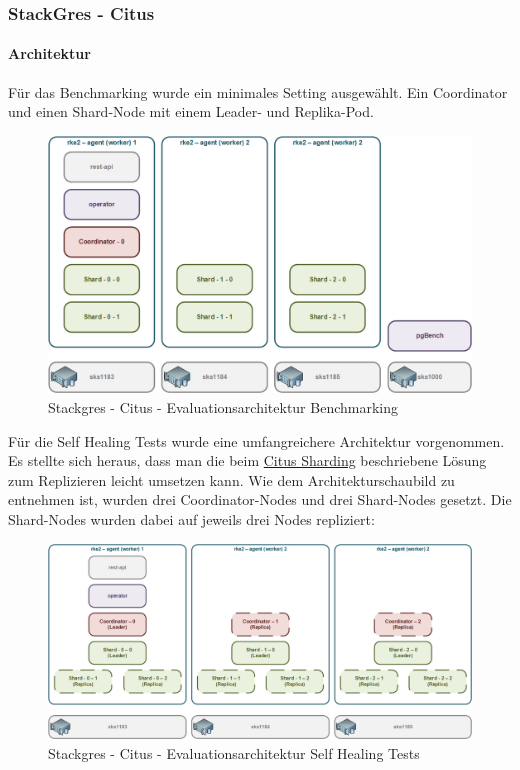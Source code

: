 
\clearpage
\begin{flushleft}
    \subsubsection{StackGres - Citus}
    \paragraph{Architektur}
    Für das Benchmarking wurde ein minimales Setting ausgewählt.
    Ein Coordinator und einen Shard-Node mit einem Leader- und Replika-Pod.
    \begin{figure}[H]
        \centering
        \includegraphics[width=0.8\linewidth]{source/implementation/evaluation/postgresql_ha_solutions/stackgres/stackgres-citus-evaluation-architecture}
        \caption{Stackgres - Citus - Evaluationsarchitektur Benchmarking}
        \label{fig:stackgres-citus-evaluation-architecture}
    \end{figure}
    Für die Self Healing Tests wurde eine umfangreichere Architektur vorgenommen.
    Es stellte sich heraus, dass man die beim \hyperref[subpar:citus_sharding]{Citus Sharding} beschriebene Lösung zum Replizieren leicht umsetzen kann.
    Wie dem Architekturschaubild zu entnehmen ist,
    wurden drei Coordinator-Nodes und drei Shard-Nodes gesetzt.
    Die Shard-Nodes wurden dabei auf jeweils drei Nodes repliziert:
    \begin{figure}[H]
        \centering
        \includegraphics[width=1\linewidth]{source/implementation/evaluation/postgresql_ha_solutions/stackgres/stackgres_citus_architecture_self_healing_test}
        \caption{Stackgres - Citus - Evaluationsarchitektur Self Healing Tests}
        \label{fig:stackgres_citus_architecture_self_healing_test}
    \end{figure}
\end{flushleft}
